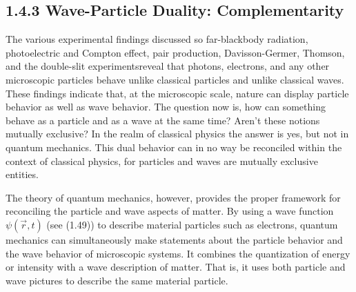\documentclass[10pt]{article}
\begin{document}
\subsection*{1.4.3 Wave-Particle Duality: Complementarity}
The various experimental findings discussed so far-blackbody radiation, photoelectric and Compton effect, pair production, Davisson-Germer, Thomson, and the double-slit experimentsreveal that photons, electrons, and any other microscopic particles behave unlike classical particles and unlike classical waves. These findings indicate that, at the microscopic scale, nature can display particle behavior as well as wave behavior. The question now is, how can something behave as a particle and as a wave at the same time? Aren't these notions mutually exclusive? In the realm of classical physics the answer is yes, but not in quantum mechanics. This dual behavior can in no way be reconciled within the context of classical physics, for particles and waves are mutually exclusive entities.

The theory of quantum mechanics, however, provides the proper framework for reconciling the particle and wave aspects of matter. By using a wave function $\psi(\vec{r}, t)$ (see (1.49)) to describe material particles such as electrons, quantum mechanics can simultaneously make statements about the particle behavior and the wave behavior of microscopic systems. It combines the quantization of energy or intensity with a wave description of matter. That is, it uses both particle and wave pictures to describe the same material particle.
\end{document}
